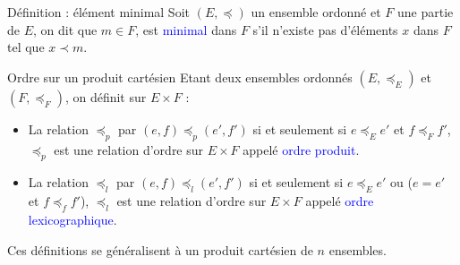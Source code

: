 \documentclass[10pt]{beamer}
\begin{document}
\begin{frame}[fragile]{\Ctitle}{\stitle}
    \begin{alertblock}{Définition : élément minimal}
        Soit $(E,\preccurlyeq)$ un ensemble ordonné et $F$ une partie de $E$, on dit que $m \in F$, est \textcolor{blue}{minimal} dans $F$ s'il n'existe pas d'éléments $x$ dans $F$ tel que $x \prec m$.
    \end{alertblock}
\end{frame}


\begin{frame}[fragile]{\Ctitle}{\stitle}
    \begin{alertblock}{Ordre sur un produit cartésien}
        Etant deux ensembles ordonnés $(E, \preccurlyeq_E)$ et $(F, \preccurlyeq_F)$, on définit sur $E \times F$ :
        \begin{itemize}
            \item<2-> La relation $\preccurlyeq_p$ par $(e,f) \preccurlyeq_p (e',f')$ si et seulement si $e \preccurlyeq_E e'$ et $f \preccurlyeq_F f'$, $\preccurlyeq_p$ est une relation d'ordre sur  $E \times F$ appelé \textcolor{blue}{ordre produit}.
            \item<3-> La relation $\preccurlyeq_l$ par $(e,f) \preccurlyeq_l (e',f')$ si et seulement si $e \preccurlyeq_E e'$ ou ($e = e'$ et $f \preccurlyeq_f f'$),  $\preccurlyeq_l$ est une relation d'ordre sur $E \times F$ appelé \textcolor{blue}{ordre lexicographique}.
        \end{itemize}
        Ces définitions se généralisent à un produit cartésien de $n$ ensembles.
    \end{alertblock}
\end{frame}
\end{document}
